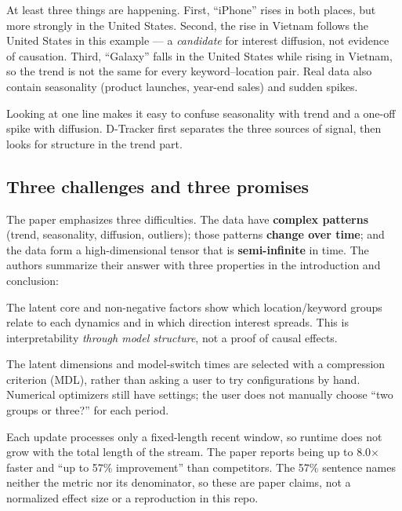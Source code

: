 At least three things are happening. First, ``iPhone'' rises in both places, but more strongly in
the United States. Second, the rise in Vietnam follows the United States in this example --- a
\emph{candidate} for interest diffusion, not evidence of causation. Third, ``Galaxy'' falls in the
United States while rising in Vietnam, so the trend is not the same for every keyword--location
pair. Real data also contain seasonality (product launches, year-end sales) and sudden spikes.

\begin{plainwords}
Looking at one line makes it easy to confuse seasonality with trend and a one-off spike with
diffusion. D-Tracker first separates the three sources of signal, then looks for structure in the
trend part.
\end{plainwords}

\subsection{Three challenges and three promises}

The paper emphasizes three difficulties. The data have \textbf{complex patterns} (trend,
seasonality, diffusion, outliers); those patterns \textbf{change over time}; and the data form a
high-dimensional tensor that is \textbf{semi-infinite} in time. The authors summarize their answer
with three properties in the introduction and conclusion:

\begin{description}[leftmargin=1.8em,style=nextline]
  \item[Interpretable.] The latent core and non-negative factors show which location/keyword groups
  relate to each dynamics and in which direction interest spreads. This is interpretability
  \emph{through model structure}, not a proof of causal effects.
  \item[Automatic.] The latent dimensions and model-switch times are selected with a compression
  criterion (MDL), rather than asking a user to try configurations by hand. Numerical optimizers
  still have settings; the user does not manually choose ``two groups or three?'' for each period.
  \item[Scalable.] Each update processes only a fixed-length recent window, so runtime does not grow
  with the total length of the stream. The paper reports being up to 8.0$\times$ faster and ``up to
  57\% improvement'' than competitors. The 57\% sentence names neither the metric nor its
  denominator, so these are paper claims, not a normalized effect size or a reproduction in this repo.
\end{description}

